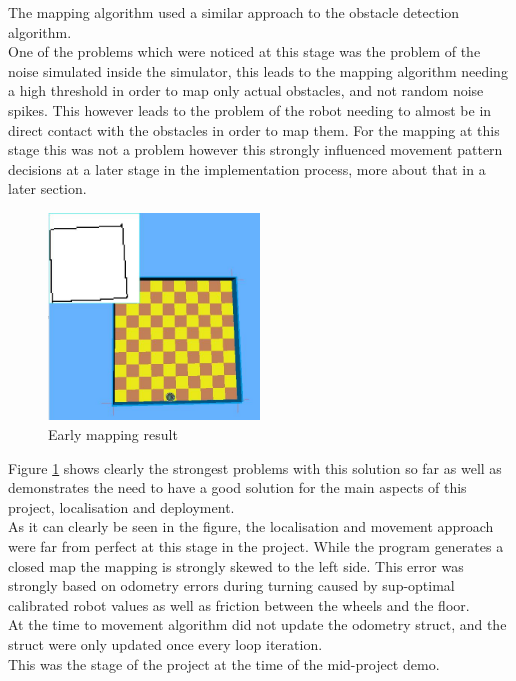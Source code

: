 The mapping algorithm used a similar approach to the obstacle detection algorithm. \\
One of the problems which were noticed at this stage was the problem of the noise simulated inside the simulator, this leads to the mapping algorithm needing a high threshold in order to map only actual obstacles, and not random noise spikes.  This however leads to the problem of the robot needing to almost be in direct contact with the obstacles in order to map them. For the mapping at this stage this was not a problem however this strongly influenced movement pattern decisions at a later stage in the implementation process, more about that in a later section.

\begin{figure}[h]
\centering
\includegraphics[width = 0.5\textwidth]{../../figures/early_map.jpg} 
\caption{Early mapping result}
\label{early_mapping_result}
\end{figure}

Figure \ref{early_mapping_result} shows clearly the strongest problems with this solution so far as well as demonstrates the need to have a good solution for  the main aspects of this project, localisation and deployment.\\
As it can clearly be seen in the figure, the localisation and movement approach were far from perfect at this stage in the project. 
While the program generates a closed  map the mapping is strongly skewed to the left side. This error was strongly based on odometry errors during turning caused by sup-optimal calibrated robot values as well as friction between the wheels and the floor.\\
At the time to movement algorithm did not update the odometry struct, and the struct were only updated once every loop iteration. \\
This was the stage of the project at the time of the mid-project demo.


